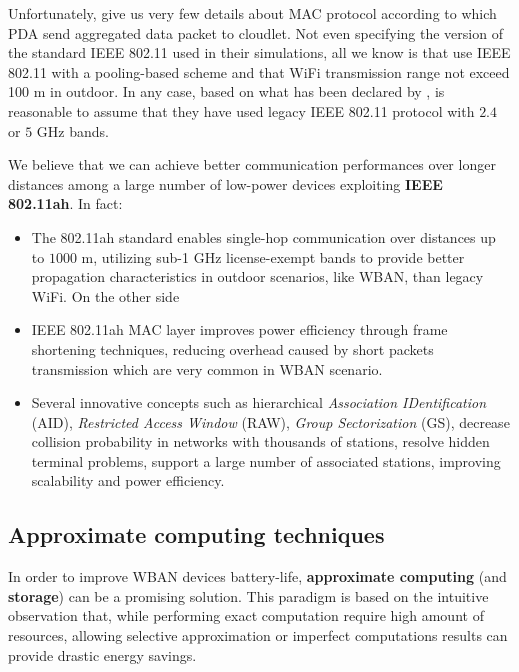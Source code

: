 \documentclass[sigchi]{acmart}
\begin{document}
Unfortunately, \citet{MSAReport} give us very few details about MAC protocol according to which PDA send aggregated data packet to cloudlet. Not even specifying the version of the standard IEEE 802.11 used in their simulations, all we know is that \citep{MSAReport} use IEEE 802.11 with a pooling-based scheme and that WiFi transmission range not exceed 100 m in outdoor. In any case, based on what has been declared by \citep{MSAReport}, is reasonable to assume that they have used legacy IEEE 802.11 protocol with $2.4$ or $5$ GHz bands.

We believe that we can achieve better communication performances over longer distances among a large number of low-power devices exploiting \textbf{IEEE 802.11ah}. In fact:

\begin{itemize}
\item The 802.11ah standard enables single-hop communication over distances up to $1000$ m, utilizing sub-1 GHz license-exempt bands to provide better propagation characteristics in outdoor scenarios, like WBAN, than legacy WiFi. On the other side

\item IEEE 802.11ah MAC layer improves power efficiency through frame shortening techniques, reducing overhead caused by short packets transmission which are very common in WBAN scenario.

\item Several innovative concepts such as hierarchical \textit{Association IDentification} (AID), \textit{Restricted Access Window} (RAW), \textit{Group Sectorization} (GS), decrease collision probability in networks with thousands of stations, resolve hidden terminal problems, support a large number of associated stations, improving scalability and power efficiency.

\end{itemize}

\subsection{Approximate computing techniques}

In order to improve WBAN devices battery-life, \textbf{approximate computing} (and \textbf{storage}) can be a promising solution. This paradigm is based on the intuitive observation that, while performing exact computation require high amount of resources, allowing selective approximation or imperfect computations results can provide drastic energy savings.
\end{document}
